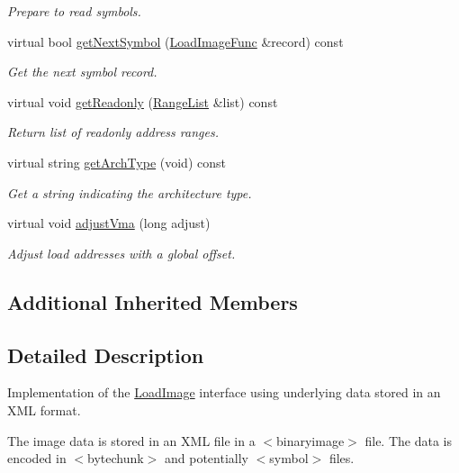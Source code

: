 \begin{DoxyCompactItemize}
\begin{DoxyCompactList}\small\item\em Prepare to read symbols. \end{DoxyCompactList}\item 
virtual bool \mbox{\hyperlink{class_load_image_xml_ab0a1e2aee8d5d8925e29662f32fa2060}{get\+Next\+Symbol}} (\mbox{\hyperlink{struct_load_image_func}{Load\+Image\+Func}} \&record) const
\begin{DoxyCompactList}\small\item\em Get the next symbol record. \end{DoxyCompactList}\item 
virtual void \mbox{\hyperlink{class_load_image_xml_adab4a4d8e035047641c5a1613e9386d6}{get\+Readonly}} (\mbox{\hyperlink{class_range_list}{Range\+List}} \&list) const
\begin{DoxyCompactList}\small\item\em Return list of {\itshape readonly} address ranges. \end{DoxyCompactList}\item 
virtual string \mbox{\hyperlink{class_load_image_xml_ad6b8dd51035746be7a59e1070e65c668}{get\+Arch\+Type}} (void) const
\begin{DoxyCompactList}\small\item\em Get a string indicating the architecture type. \end{DoxyCompactList}\item 
virtual void \mbox{\hyperlink{class_load_image_xml_ab6a98e9bcf8141caee525fefc6a6d115}{adjust\+Vma}} (long adjust)
\begin{DoxyCompactList}\small\item\em Adjust load addresses with a global offset. \end{DoxyCompactList}\end{DoxyCompactItemize}
\subsection*{Additional Inherited Members}


\subsection{Detailed Description}
Implementation of the \mbox{\hyperlink{class_load_image}{Load\+Image}} interface using underlying data stored in an X\+ML format. 

The image data is stored in an X\+ML file in a $<$binaryimage$>$ file. The data is encoded in $<$bytechunk$>$ and potentially $<$symbol$>$ files. 

